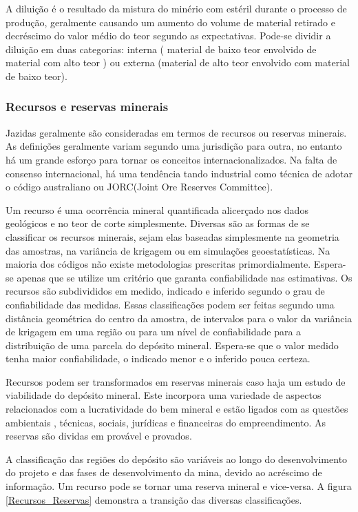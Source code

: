 A diluição é o resultado da mistura do minério com estéril durante o processo de produção, geralmente causando um aumento do volume de material retirado e decréscimo do valor médio do teor segundo as expectativas. Pode-se dividir a diluição em duas categorias: interna ( material de baixo teor envolvido de material com alto teor ) ou externa (material de alto teor envolvido com material de baixo teor). 

\subsubsection{Recursos e reservas minerais}

Jazidas geralmente são consideradas em termos de recursos ou reservas minerais. As definições geralmente variam segundo uma jurisdição para outra, no entanto há um grande esforço para tornar os conceitos internacionalizados. Na falta de consenso internacional, há uma tendência tando industrial como técnica de adotar o código australiano ou JORC(Joint Ore Reserves Committee).

Um recurso é uma ocorrência mineral quantificada alicerçado nos dados geológicos e no teor de corte simplesmente. Diversas são as formas de se classificar os recursos minerais, sejam elas baseadas simplesmente na geometria das amostras, na variância de krigagem ou em simulações geoestatísticas. Na maioria dos códigos não existe metodologias prescritas primordialmente. Espera-se apenas que se utilize um critério que garanta confiabilidade nas estimativas. Os recursos são subdivididos em medido, indicado e inferido segundo o grau de confiabilidade das medidas. Essas classificações podem ser feitas segundo uma distância geométrica do centro da amostra, de intervalos para o valor da variância de krigagem em uma região ou para um nível de confiabilidade para a distribuição de uma parcela do depósito mineral. Espera-se que o valor medido tenha maior confiabilidade, o indicado menor e o inferido pouca certeza.
  
Recursos podem ser transformados em reservas minerais caso haja um estudo de viabilidade do depósito mineral. Este incorpora uma variedade de aspectos relacionados com a lucratividade do bem mineral e estão ligados com as questões ambientais , técnicas, sociais, jurídicas e financeiras do empreendimento. As reservas são dividas em provável e provados. 

A classificação das regiões do depósito são variáveis ao longo do desenvolvimento do projeto e das fases de desenvolvimento da mina, devido ao acréscimo de informação. Um recurso pode se tornar uma reserva mineral e vice-versa. A figura \eqref{Recursos_Reservas} demonstra a transição das diversas classificações. 

